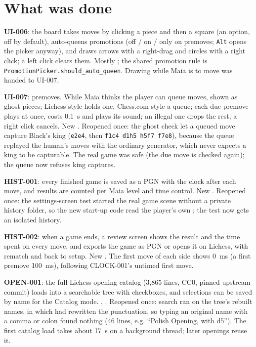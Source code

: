 \documentclass[11pt,a4paper]{article}
\begin{document}
\section*{What was done}

\textbf{UI-006}: the board takes moves by clicking a piece and then a square (an option, off
by default), auto-queens promotions (off / on / only on premoves; \texttt{Alt} opens the picker
anyway), and draws arrows with a right-drag and circles with a right click; a left click
clears them. Mostly ; the shared promotion rule is
\texttt{PromotionPicker.should\_auto\_queen}. Drawing while Maia is to move was handed to
UI-007.

\textbf{UI-007}: premoves. While Maia thinks the player can queue moves, shown as ghost pieces;
Lichess style holds one, Chess.com style a queue; each due premove plays at once, costs 0.1~s
and plays its sound; an illegal one drops the rest; a right click cancels. New
. Reopened once: the ghost check let a queued move capture Black's
king (\texttt{e2e4}, then \texttt{f1c4 d1h5 h5f7 f7e8}), because the queue replayed the human's
moves with the ordinary generator, which never expects a king to be capturable. The real game
was safe (the due move is checked again); the queue now refuses king captures.

\textbf{HIST-001}: every finished game is saved as a PGN with the clock after each move, and
results are counted per Maia level and time control. New . Reopened
once: the settings-screen test started the real game scene without a private history folder,
so the new start-up code read the player's own ; the test now gets an
isolated history.

\textbf{HIST-002}: when a game ends, a review screen shows the result and the time spent on
every move, and exports the game as PGN or opens it on Lichess, with rematch and back to setup.
New . The first move of each side shows 0~ms (a first premove 100~ms),
following CLOCK-001's untimed first move.

\textbf{OPEN-001}: the full Lichess opening catalog (3,865 lines, CC0, pinned upstream commit)
loads into a searchable tree with checkboxes, and selections can be saved by name for the
Catalog mode. , . Reopened once: search ran on
the tree's rebuilt names, in which  had rewritten the punctuation, so typing
an original name with a comma or colon found nothing (46 lines, e.g. ``Polish Opening, with
d5''). The first catalog load takes about 17~s on a background thread; later openings reuse it.
\end{document}
